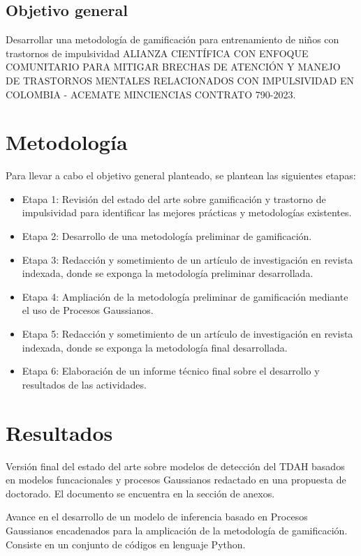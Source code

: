 \documentclass[10pt,table,xcdraw]{article}
\begin{document}
	\subsection{Objetivo general}
	Desarrollar una metodología de gamificación para entrenamiento de niños con trastornos de impulsividad ALIANZA CIENTÍFICA CON ENFOQUE COMUNITARIO PARA MITIGAR BRECHAS DE ATENCIÓN Y MANEJO DE TRASTORNOS MENTALES RELACIONADOS CON IMPULSIVIDAD EN COLOMBIA - ACEMATE MINCIENCIAS CONTRATO 790-2023.
	
	
	\section{Metodología}
	Para llevar a cabo el objetivo general planteado, se plantean las siguientes etapas:
	\begin{itemize}
	\item Etapa 1: Revisión del estado del arte sobre gamificación y trastorno de impulsividad para identificar las mejores prácticas y metodologías existentes.
	\item Etapa 2: Desarrollo de una metodología preliminar de gamificación.
	\item Etapa 3: Redacción y sometimiento de un artículo de investigación en revista indexada, donde se exponga la metodología preliminar desarrollada.
	\item Etapa 4: Ampliación de la metodología preliminar de gamificación mediante el uso de Procesos Gaussianos.
	\item Etapa 5: Redacción y sometimiento de un artículo de investigación en revista indexada, donde se exponga la metodología final desarrollada.
	\item Etapa 6: Elaboración de un informe técnico final sobre el desarrollo y resultados de las actividades.
	\end{itemize}
	
	\section{Resultados}
	Versión final del estado del arte sobre modelos de detección del TDAH basados en modelos funcacionales y procesos Gaussianos redactado en una propuesta de doctorado. El documento se encuentra en la sección de anexos.
	
	Avance en el desarrollo de un modelo de inferencia basado en Procesos Gaussianos encadenados para la amplicación de la metodología de gamificación. Consiste en un conjunto de códigos en lenguaje Python.
	
	
	
%	
	
\end{document}

